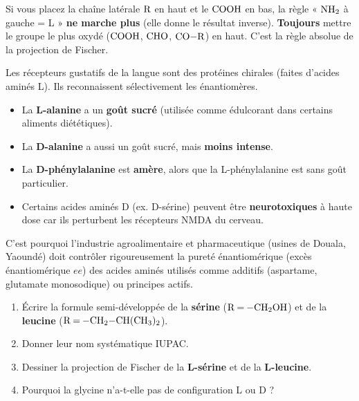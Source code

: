 \documentclass[11pt]{article}
\newcounter{popsec}
\newcounter{popsub}
\newcommand{\courssub}[1]{%
  \stepcounter{popsub}%
  \par\vspace{9pt}\noindent{\popxbold\fontsize{11.5}{13}\selectfont\color{popink}{\color{poporange}\thepopsec.\thepopsub}\hspace{6pt}#1}\par\nopagebreak\vspace{4pt}
}
\begin{document}
\begin{attention}
Si vous placez la chaîne latérale $\ce{R}$ en haut et le $\ce{COOH}$ en bas, la règle « $\ce{NH2}$ à gauche = L » \textbf{ne marche plus} (elle donne le résultat inverse). \textbf{Toujours} mettre le groupe le plus oxydé ($\ce{COOH}$, $\ce{CHO}$, $\ce{CO-R}$) en haut. C'est la règle absolue de la projection de Fischer.
\end{attention}

\begin{savaistu}
Les récepteurs gustatifs de la langue sont des protéines chirales (faites d'acides aminés L). Ils reconnaissent sélectivement les énantiomères.
\begin{itemize}
    \item La \textbf{L-alanine} a un \textbf{goût sucré} (utilisée comme édulcorant dans certains aliments diététiques).
    \item La \textbf{D-alanine} a aussi un goût sucré, mais \textbf{moins intense}.
    \item La \textbf{D-phénylalanine} est \textbf{amère}, alors que la L-phénylalanine est sans goût particulier.
    \item Certains acides aminés D (ex. D-sérine) peuvent être \textbf{neurotoxiques} à haute dose car ils perturbent les récepteurs NMDA du cerveau.
\end{itemize}
C'est pourquoi l'industrie agroalimentaire et pharmaceutique (usines de Douala, Yaoundé) doit contrôler rigoureusement la pureté énantiomérique (excès énantiomérique $ee$) des acides aminés utilisés comme additifs (aspartame, glutamate monosodique) ou principes actifs.
\end{savaistu}

\courssub{Exercices d'application}

\begin{exercice}
\begin{enumerate}
    \item Écrire la formule semi-développée de la \textbf{sérine} ($\ce{R = -CH2OH}$) et de la \textbf{leucine} ($\ce{R = -CH2-CH(CH3)2}$).
    \item Donner leur nom systématique IUPAC.
    \item Dessiner la projection de Fischer de la \textbf{L-sérine} et de la \textbf{L-leucine}.
    \item Pourquoi la glycine n'a-t-elle pas de configuration L ou D ?
\end{enumerate}
\end{exercice}
\end{document}
